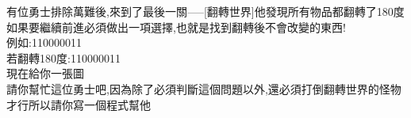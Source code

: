 有位勇士排除萬難後,來到了最後一關-----[翻轉世界]他發現所有物品都翻轉了180度如果要繼續前進必須做出一項選擇,也就是找到翻轉後不會改變的東西!\\
例如:110000011\\
若翻轉180度:110000011\\
現在給你一張圖\\
請你幫忙這位勇士吧,因為除了必須判斷這個問題以外,還必須打倒翻轉世界的怪物才行所以請你寫一個程式幫他